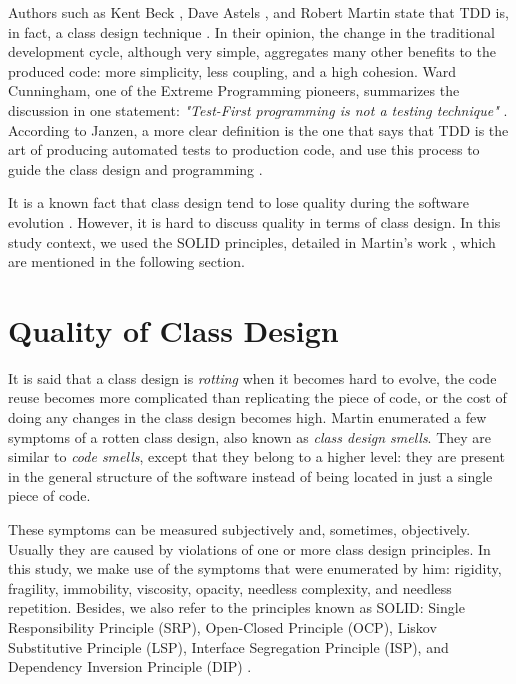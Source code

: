 \documentclass[times]{speauth}
\begin{document}
Authors such as Kent Beck \cite{aim-fire}, Dave Astels \cite{astels-tdd}, and
Robert Martin \cite{bob-martin} state that TDD is, in fact, a class design
technique \cite{tdd-taxonomy} \cite{aim-fire}.
In their opinion, the change in the traditional development cycle, although very simple,
aggregates many other benefits to the produced code: more simplicity, less coupling, and
a high cohesion. Ward Cunningham, one of the Extreme Programming pioneers, summarizes
the discussion in one statement: \textit{"Test-First programming is not a testing technique"} 
\cite{aim-fire}.
According to Janzen, a more clear definition is the one that says that TDD is the 
art of producing automated tests to production code, and use this process to guide
the class design and programming \cite{agilealliance-tdd} \cite{tdd-taxonomy}.

It is a known fact that class design tend to lose quality during the software evolution \cite{evolution-lehman}.
However, it is hard to discuss quality in terms of class design. In this study context,
we used the SOLID principles, detailed in Martin's work \cite{bob-martin}, which are
mentioned in the following section.

\section{Quality of Class Design}

It is said that a class design is \textit{rotting} when it becomes hard
to evolve, the code reuse becomes more complicated than replicating the piece
of code, or the cost of doing any changes in the class design becomes high.
Martin \cite{bob-martin} enumerated a few symptoms of a rotten class design,
also known as \textit{class design smells}. They are similar to \textit{code smells},
except that they belong to a higher level: they are present in the general structure
of the software instead of being located in just a single piece of code.

These symptoms can be measured subjectively and, sometimes, objectively. Usually
they are caused by violations of one or more class design principles.
In this study, we make use of the symptoms that were enumerated by him: 
rigidity, fragility, immobility, viscosity, opacity, needless complexity, and
needless repetition. Besides, we also refer to the principles known as SOLID:
Single Responsibility Principle (SRP), Open-Closed Principle (OCP),
Liskov Substitutive Principle (LSP), Interface Segregation Principle (ISP), and
Dependency Inversion Principle (DIP) \cite{bob-martin}.
\end{document}
